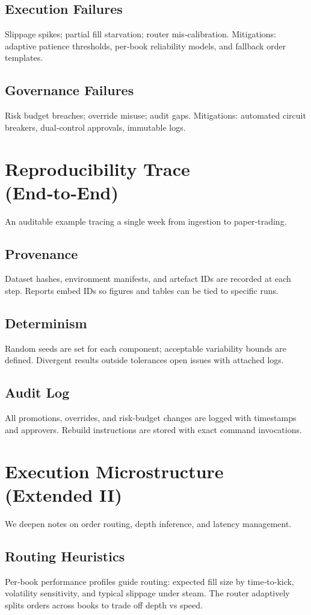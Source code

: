 \documentclass[12pt]{report}  %
\numberwithin{equation}{section}
\theoremstyle{plain}
\theoremstyle{definition}
\theoremstyle{remark}
\begin{document}
\section{Execution Failures}
Slippage spikes; partial fill starvation; router mis‑calibration. Mitigations: adaptive patience thresholds, per‑book reliability models, and fallback order templates.

\section{Governance Failures}
Risk budget breaches; override misuse; audit gaps. Mitigations: automated circuit breakers, dual‑control approvals, immutable logs.

\chapter{Reproducibility Trace (End‑to‑End)}
An auditable example tracing a single week from ingestion to paper‑trading.

\section{Provenance}
Dataset hashes, environment manifests, and artefact IDs are recorded at each step. Reports embed IDs so figures and tables can be tied to specific runs.

\section{Determinism}
Random seeds are set for each component; acceptable variability bounds are defined. Divergent results outside tolerances open issues with attached logs.

\section{Audit Log}
All promotions, overrides, and risk‑budget changes are logged with timestamps and approvers. Rebuild instructions are stored with exact command invocations.

\chapter{Execution Microstructure (Extended II)}
We deepen notes on order routing, depth inference, and latency management.

\section{Routing Heuristics}
Per‑book performance profiles guide routing: expected fill size by time‑to‑kick, volatility sensitivity, and typical slippage under steam. The router adaptively splits orders across books to trade off depth vs speed.
\end{document}
